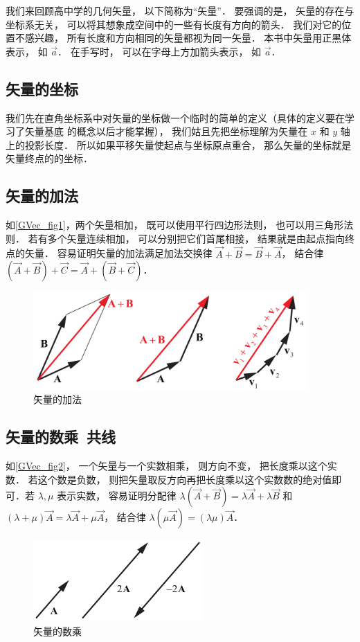 
我们来回顾高中学的几何矢量， 以下简称为“矢量”． 要强调的是， 矢量的存在与坐标系无关， 可以将其想象成空间中的一些有长度有方向的箭头． 我们对它的位置不感兴趣， 所有长度和方向相同的矢量都视为同一矢量． 本书中矢量用正黑体表示， 如 $\vec a$． 在手写时， 可以在字母上方加箭头表示， 如 $\overrightarrow{a}$．

\subsection{矢量的坐标}
我们先在直角坐标系中对矢量的坐标做一个临时的简单的定义（具体的定义要在学习了矢量基底%
的概念以后才能掌握）， 我们姑且先把坐标理解为矢量在 $x$ 和 $y$ 轴上的投影长度． 所以如果平移矢量使起点与坐标原点重合， 那么矢量的坐标就是矢量终点的的坐标．

\subsection{矢量的加法}
如\autoref{GVec_fig1}，两个矢量相加， 既可以使用平行四边形法则， 也可以用三角形法则． 若有多个矢量连续相加， 可以分别把它们首尾相接， 结果就是由起点指向终点的矢量． 容易证明矢量的加法满足加法交换律 $\vec A + \vec B = \vec B + \vec A$， 结合律 $(\vec A + \vec B) + \vec C = \vec A + (\vec B + \vec C)$．
\begin{figure}[ht]
\centering
\includegraphics[width=10.5cm]{./figures/GVec1.pdf}
\caption{矢量的加法} \label{GVec_fig1}
\end{figure}

\subsection{矢量的数乘\ 共线}
如\autoref{GVec_fig2}， 一个矢量与一个实数相乘， 则方向不变， 把长度乘以这个实数． 若这个数是负数， 则把矢量取反方向再把长度乘以这个实数数的绝对值即可．若 $\lambda, \mu$ 表示实数， 容易证明分配律 $\lambda(\vec A + \vec B) = \lambda\vec A + \lambda\vec B$ 和 $(\lambda+\mu)\vec A = \lambda\vec A + \mu\vec A$， 结合律 $\lambda(\mu\vec A) = (\lambda\mu) \vec A$．
\begin{figure}[ht]
\centering
\includegraphics[width=6.5cm]{./figures/GVec2.pdf}
\caption{矢量的数乘} \label{GVec_fig2}
\end{figure}


